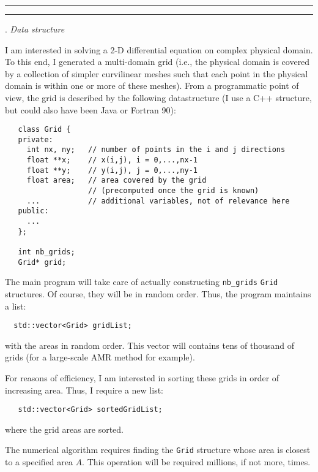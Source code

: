 \documentclass [11point]{article}
\begin{document}
\bigskip
\hrule 




\pagebreak
\hrule 
{}. \textit{Data structure}
\bigskip

I am interested in solving a 2-D differential equation on complex physical domain. 
To this end, I generated a multi-domain grid (i.e., the physical domain is covered
by a collection of simpler curvilinear meshes such that each point in the physical domain is 
within one or more of these meshes). From a programmatic point of view, the grid is
described by the following datastructure (I use a C++ structure, but could also have been Java 
or Fortran 90): 
\begin{verbatim}
   class Grid {
   private:
     int nx, ny;   // number of points in the i and j directions
     float **x;    // x(i,j), i = 0,...,nx-1
     float **y;    // y(i,j), j = 0,...,ny-1
     float area;   // area covered by the grid 
	               // (precomputed once the grid is known)
     ...           // additional variables, not of relevance here
   public:
     ...
   };
   
   int nb_grids;
   Grid* grid;
\end{verbatim}

The main program will take care of actually constructing {\tt{nb\_grids}} {\tt{Grid}} structures. 
Of course, they will be in random order. Thus, the program maintains a list: 
\begin{verbatim}
  std::vector<Grid> gridList;
\end{verbatim}
with the areas in random order. This vector will contains tens of thousand of grids 
(for a large-scale AMR method for example). 


For reasons of efficiency, I am interested in 
sorting these grids in order of increasing area. Thus, I require a new list:
\begin{verbatim}
   std::vector<Grid> sortedGridList;
\end{verbatim}
where the grid areas are sorted. 

The numerical  algorithm requires finding the {\tt{Grid}} structure whose area is closest to a specified
area $A$. This operation will be required millions, if not more, times. 
\end{document}
